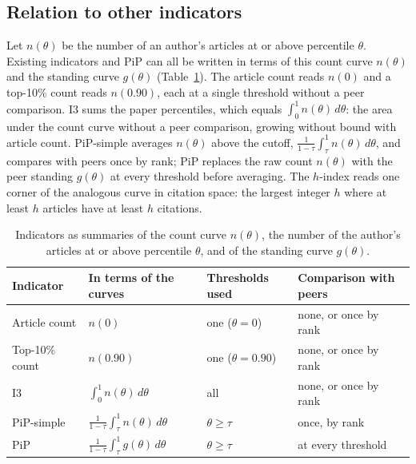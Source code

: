 \documentclass[11pt]{article}
\begin{document}
\subsection{Relation to other indicators}
\label{sec:relation}
Let $n(\theta)$ be the number of an author's articles at or above percentile $\theta$. Existing indicators and PiP can
all be written in terms of this count curve $n(\theta)$ and the standing curve $g(\theta)$ (Table~\ref{tab:taxonomy}).
The article count reads $n(0)$ and a top-10\% count reads $n(0.90)$, each at a single threshold without a peer
comparison. I3 sums the paper percentiles, which equals $\int_0^1 n(\theta)\,d\theta$: the area under the count curve
without a peer comparison, growing without bound with article count. PiP-simple averages $n(\theta)$ above the cutoff,
$\frac{1}{1-\tau}\int_\tau^1 n(\theta)\,d\theta$, and compares with peers once by rank; PiP replaces the raw count
$n(\theta)$ with the peer standing $g(\theta)$ at every threshold before averaging. The $h$-index reads one corner of
the analogous curve in citation space: the largest integer $h$ where at least $h$ articles have at least $h$ citations.

\begin{table}[t]
  \centering
  \small
  \caption{Indicators as summaries of the count curve $n(\theta)$, the number of the author's articles at or above
  percentile $\theta$, and of the standing curve $g(\theta)$.}
  \label{tab:taxonomy}
  \begin{tabular}{llll}
    \toprule
    Indicator & In terms of the curves & Thresholds used & Comparison with peers \\
    \midrule
    Article count & $n(0)$ & one ($\theta = 0$) & none, or once by rank \\
    Top-10\% count & $n(0.90)$ & one ($\theta = 0.90$) & none, or once by rank \\
    I3 & $\int_0^1 n(\theta)\,d\theta$ & all & none, or once by rank \\
    PiP-simple & $\frac{1}{1-\tau}\int_\tau^1 n(\theta)\,d\theta$ & $\theta \ge \tau$ & once, by rank \\
    PiP & $\frac{1}{1-\tau}\int_\tau^1 g(\theta)\,d\theta$ & $\theta \ge \tau$ & at every threshold \\
    \bottomrule
  \end{tabular}
\end{table}
\end{document}
